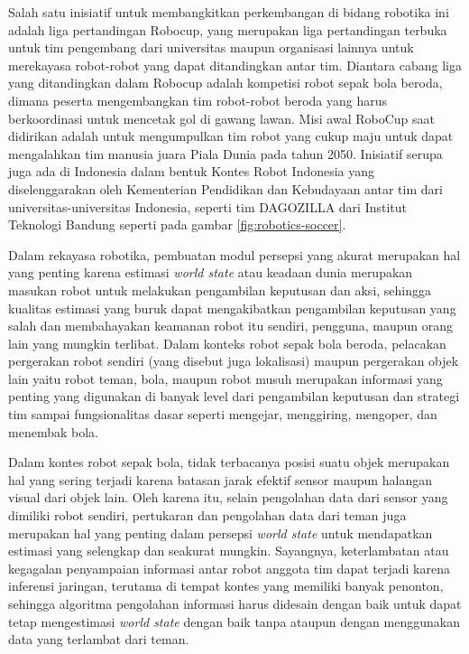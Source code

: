 Salah satu inisiatif untuk membangkitkan perkembangan di bidang robotika ini adalah liga pertandingan Robocup, yang merupakan liga pertandingan terbuka untuk tim pengembang dari universitas maupun organisasi lainnya untuk merekayasa robot-robot yang dapat ditandingkan antar tim. Diantara cabang liga yang ditandingkan dalam Robocup adalah kompetisi robot sepak bola beroda, dimana peserta mengembangkan tim robot-robot beroda yang harus berkoordinasi untuk mencetak gol di gawang lawan. Misi awal RoboCup saat didirikan adalah untuk mengumpulkan tim robot yang cukup maju untuk dapat mengalahkan tim manusia juara Piala Dunia pada tahun 2050. Inisiatif serupa juga ada di Indonesia dalam bentuk Kontes Robot Indonesia yang diselenggarakan oleh Kementerian Pendidikan dan Kebudayaan antar tim dari universitas-universitas Indonesia, seperti tim DAGOZILLA dari Institut Teknologi Bandung seperti pada gambar \ref{fig:robotics-soccer}.

Dalam rekayasa robotika, pembuatan modul persepsi yang akurat merupakan hal yang penting karena estimasi \textit{world state} atau keadaan dunia merupakan masukan robot untuk melakukan pengambilan keputusan dan aksi, sehingga kualitas estimasi yang buruk dapat mengakibatkan pengambilan keputusan yang salah dan membahayakan keamanan robot itu sendiri, pengguna, maupun orang lain yang mungkin terlibat. Dalam konteks robot sepak bola beroda, pelacakan pergerakan robot sendiri (yang disebut juga lokalisasi) maupun pergerakan objek lain yaitu robot teman, bola, maupun robot musuh merupakan informasi yang penting yang digunakan di banyak level dari pengambilan keputusan dan strategi tim sampai fungsionalitas dasar seperti mengejar, menggiring, mengoper, dan menembak bola.

Dalam kontes robot sepak bola, tidak terbacanya posisi suatu objek merupakan hal yang sering terjadi karena batasan jarak efektif sensor maupun halangan visual dari objek lain. Oleh karena itu, selain pengolahan data dari sensor yang dimiliki robot sendiri, pertukaran dan pengolahan data dari teman juga merupakan hal yang penting dalam persepsi \textit{world state} untuk mendapatkan estimasi yang selengkap dan seakurat mungkin.  Sayangnya, keterlambatan atau kegagalan penyampaian informasi antar robot anggota tim dapat terjadi karena inferensi jaringan, terutama di tempat kontes yang memiliki banyak penonton, sehingga algoritma pengolahan informasi harus didesain dengan baik untuk dapat tetap mengestimasi \textit{world state} dengan baik tanpa ataupun dengan menggunakan data yang terlambat dari teman.

